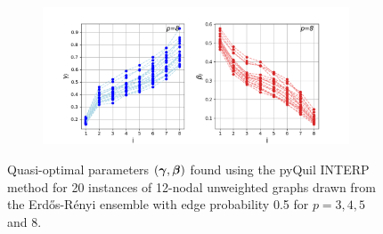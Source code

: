 \begin{figure}[H]
\begin{subfigure}[t]{0.7\textwidth}
	\end{subfigure}
	\\
	\centering
	\begin{subfigure}[t]{0.7\textwidth}
		\centering
		\includegraphics[width=\textwidth]{figures/interp/patterns/pattern_12-nodal_ER050_p-8.png}
	\end{subfigure}
	\caption{Quasi-optimal parameters $(\bm{\gamma},\bm{\beta})$ found using the pyQuil INTERP method for 20 instances of 12-nodal unweighted graphs drawn from the Erd\H{o}s-R\'enyi ensemble with edge probability 0.5 for $p = 3, 4, 5$ and $8$.}
	\label{fig:appendix-patterns-12-nodal-ER050}
\end{figure}

